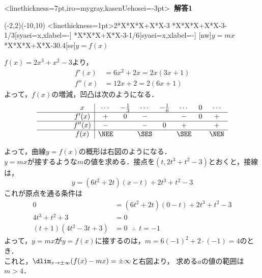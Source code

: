 \documentclass[10pt,
b5paper,
fleqn,
dvipdfmx,
uplatex
]{jsarticle}
\newcommand{\bb}{\bf\boldmath}%
\newenvironment{leftbbar}{%
\def\FrameCommand{\color{mygray} \vrule width 5pt \hspace{1zw}
\color{black}}%
\MakeFramed {\advance\hsize-\width \FrameRestore}}%
{\endMakeFramed}
\newenvironment{解答1}{
\hspace{-2zw}\phkasen<linethickness=7pt,iro=mygray,kasenUehosei=-3pt>{\bf \large \ 解答1\ }\vspace{-1zw}\begin{leftbbar}}{\end{leftbbar}}
\begin{document}
{\begin{解答1}
\begin{mawarikomi}{}{
\iffigure
\begin{zahyou}[ul=13mm,yscale=0.2,xscale=1](-2,2)(-10,10)
\def\Fx{2*X*X*X+X*X-3}
\YGraph<linethickness=1pt>\Fx
{}
\YPointPut\Fx{-1/3}[syaei=x,xlabel=-]{}
\YPointPut\Fx{-1/6}[syaei=x,xlabel=-]{}
[nw]{$y=mx$}
\YPointPut\Fx{0.4}[se]{$y=f(x)$}
\end{zahyou}
\fi
}
$f(x)=2x^3+x^2-3$より，
\begin{align*}
f'(x)&=6x^2+2x=2x(3x+1)\\
f''(x)&=12x+2=2(6x+1)
\end{align*}
よって，$f(x)$の増減，凹凸は次のようになる．
\[\begin{array}{c|cccccccc}
\phantom{\bunsuu 11} x	&\cdots	&-\frac 13	&\cdots	&-\frac 16	&\cdots	&0		&\cdots	 	\\\hline
\phantom{\bunsuu 11}f'(x)	&+		&0			&-		&			&-		&0		&+			\\\hline
\phantom{\bunsuu 11}f''(x)	&-		&			&-		&0			&+		&		&+			\\\hline
\phantom{\bunsuu 11}f(x)	&\NEE	&			&\SES	&			&\SEE	&		&\NEN		\\
\end{array}
\]
\end{mawarikomi}
よって，曲線$y=f(x)$の概形は右図のようになる．\\
$y=mx$が接するような$m$の値を求める．接点を$(t,2t^3+t^2-3)$とおくと，接線は，
\[y=(6t^2+2t)(x-t)+2t^3+t^2-3\]
これが原点を通る条件は
\begin{align*}
0&=(6t^2+2t)(0-t)+2t^3+t^2-3\\
4t^3+t^2+3&=0\\
(t+1)(4t^2-3t+3)&=0\ \ \ \therefore\ \ t=-1
\end{align*}
よって，$y=mx$が$y=f(x)$に接するのは，$m=6(-1)^2+2\cdot(-1)=4$のとき．\\
これと，$\dlim_{x \to \pm\infty}(f(x)-mx)= \pm \infty$と右図より，
求める$a$の値の範囲は{\bb $m>4$}．
\end{解答1}

\newpage

}
\end{document}
